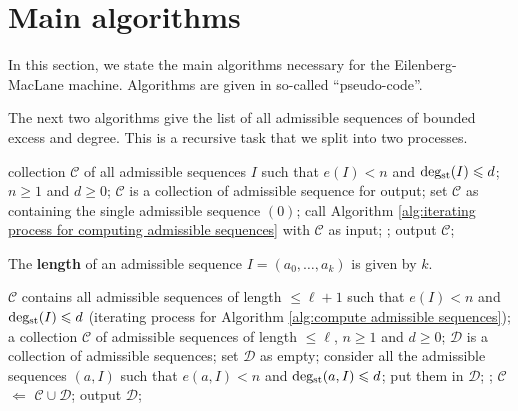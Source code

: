 \section{Main algorithms}\label{section:alg}

In this section, we state the main algorithms necessary for the Eilenberg-MacLane machine. Algorithms are given in so-called ``pseudo-code''.

\renewcommand{\algorithmicensure}{\underline{\textbf{Ensure:}}}

\bigskip
The next two algorithms give the list of all admissible sequences of bounded excess and  degree. This is a recursive task that we split into two processes. 

\begin{alg}\label{alg:compute admissible sequences}
\begin{algorithmic}[1]
\ENSURE collection $\mathcal C$ of all admissible sequences $I$ such that $e(I)<n$ and $\operatorname{deg_{st}}(I)\leqslant d$;
\REQUIRE $n\geq1$ and $d\geq0$;
\STATE $\mathcal C$ is a collection of admissible sequence for output;
\STATE set $\mathcal C$ as containing the single admissible sequence $(0)$;
\REPEAT
\STATE call Algorithm \ref{alg:iterating process for computing admissible sequences} with $\mathcal C$ as input;
;
\STATE output $\mathcal C$;
\end{algorithmic}
\end{alg}

\begin{defn}
The {\bf length} of an admissible sequence $I=(a_0,\dots,a_k)$ is given by $k$.
\end{defn}

\begin{alg}\label{alg:iterating process for computing admissible sequences}
\begin{algorithmic}[1]
\ENSURE $\mathcal C$ contains all admissible sequences of length $\leq\ell+1$ such that $e(I)<n$ and $\operatorname{deg_{st}}(I)\leqslant d$ (iterating process for Algorithm \ref{alg:compute admissible sequences});
\REQUIRE a collection $\mathcal C$ of admissible sequences of length $\leq\ell$, $n\geq1$ and $d\geq0$;
\STATE $\mathcal D$ is a collection of admissible sequences;
\STATE set $\mathcal D$ as empty;
\STATE consider all the admissible sequences $(a,I)$ such that $e(a,I)<n$ and $\operatorname{deg_{st}}(a,I)\leqslant d$;
\STATE put them in $\mathcal D$;
\ENDFOR;
\STATE $\mathcal C$ $\Leftarrow$ $\mathcal C\cup\mathcal D$;
\STATE output $\mathcal D$;
\end{algorithmic}
\end{alg}

